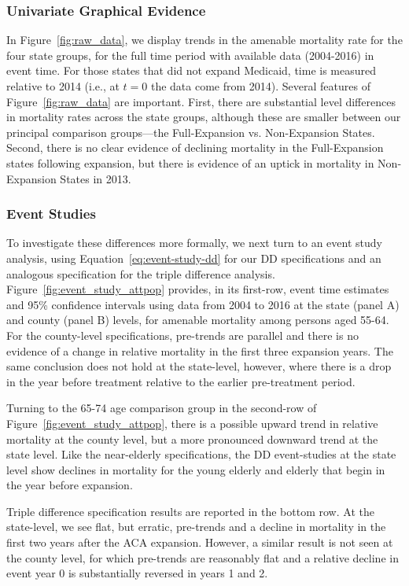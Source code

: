\documentclass[12pt]{article}%
\begin{document}
\subsubsection{Univariate Graphical Evidence}
In Figure~\ref{fig:raw_data}, we display trends in the amenable mortality rate for the four state groups, for the full time period with available data (2004-2016) in event time. 
For those states that did not expand Medicaid, time is measured relative to 2014 (i.e., at $t=0$ the data come from 2014). 
Several features of Figure~\ref{fig:raw_data} are important.  
First, there are substantial level differences in mortality rates across the state groups, although these are smaller between our principal comparison groups—the Full-Expansion vs. Non-Expansion States.  
Second, there is no clear evidence of declining mortality in the Full-Expansion states following expansion, but there is evidence of an uptick in mortality in Non-Expansion States in 2013. 


\subsubsection{Event Studies}
To investigate these differences more formally, we next turn to an event study analysis, using Equation~\ref{eq:event-study-dd} for our DD specifications and an analogous specification for the triple difference analysis.
Figure~\ref{fig:event_study_attpop} provides, in its first-row, event time estimates and 95\% confidence intervals using data from  2004 to 2016 at the state (panel A) and county (panel B) levels, for amenable mortality among persons aged 55-64.  
For the county-level specifications, pre-trends are parallel and there is no evidence of a change in relative mortality in the first three expansion years. 
The same conclusion does not hold at the state-level, however, where there is a drop in the year before treatment relative to the earlier pre-treatment period. 

Turning to the 65-74 age comparison group in the second-row of Figure~\ref{fig:event_study_attpop}, there is a possible upward trend in relative mortality at the county level, but a more pronounced downward trend at the state level. 
Like the near-elderly specifications, the DD event-studies at the state level show declines in mortality for the young elderly and elderly that begin in the year before expansion. 

Triple difference specification results are reported in the bottom row. 
At the state-level, we see flat, but erratic, pre-trends and a decline in mortality in the first two years after the ACA expansion. 
However, a similar result is not seen at the county level, for which pre-trends are reasonably flat and a relative decline in event year 0 is substantially reversed in years 1 and 2. 
\end{document}
